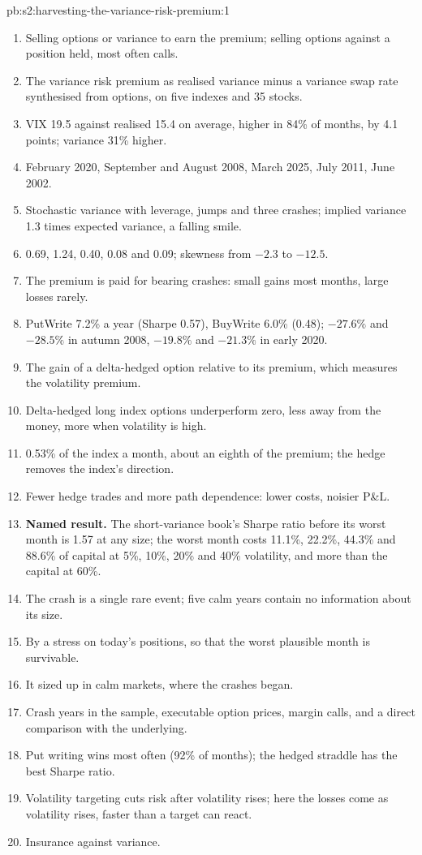 \begin{solution}{pb:s2:harvesting-the-variance-risk-premium:1}
\begin{enumerate}
\item Selling options or variance to earn the premium; selling options against a position held, most often calls.
\item The variance risk premium as realised variance minus a variance swap rate synthesised from options, on five indexes and 35 stocks.
\item VIX 19.5 against realised 15.4 on average, higher in 84\% of months, by 4.1 points; variance 31\% higher.
\item February 2020, September and August 2008, March 2025, July 2011, June 2002.
\item Stochastic variance with leverage, jumps and three crashes; implied variance 1.3 times expected variance, a falling smile.
\item 0.69, 1.24, 0.40, 0.08 and 0.09; skewness from $-2.3$ to $-12.5$.
\item The premium is paid for bearing crashes: small gains most months, large losses rarely.
\item PutWrite 7.2\% a year (Sharpe 0.57), BuyWrite 6.0\% (0.48); $-27.6\%$ and $-28.5\%$ in autumn 2008, $-19.8\%$ and $-21.3\%$ in early 2020.
\item The gain of a delta-hedged option relative to its premium, which measures the volatility premium.
\item Delta-hedged long index options underperform zero, less away from the money, more when volatility is high.
\item 0.53\% of the index a month, about an eighth of the premium; the hedge removes the index's direction.
\item Fewer hedge trades and more path dependence: lower costs, noisier P\&L.
\item \textbf{Named result.} The short-variance book's Sharpe ratio before its worst month is 1.57 at any size; the worst month costs 11.1\%, 22.2\%,
44.3\% and 88.6\% of capital at 5\%, 10\%, 20\% and 40\% volatility, and more than the capital at 60\%.
\item The crash is a single rare event; five calm years contain no information about its size.
\item By a stress on today's positions, so that the worst plausible month is survivable.
\item It sized up in calm markets, where the crashes began.
\item Crash years in the sample, executable option prices, margin calls, and a direct comparison with the underlying.
\item Put writing wins most often (92\% of months); the hedged straddle has the best Sharpe ratio.
\item Volatility targeting cuts risk after volatility rises; here the losses come as volatility rises, faster than a target can react.
\item Insurance against variance.
\end{enumerate}
\end{solution}

